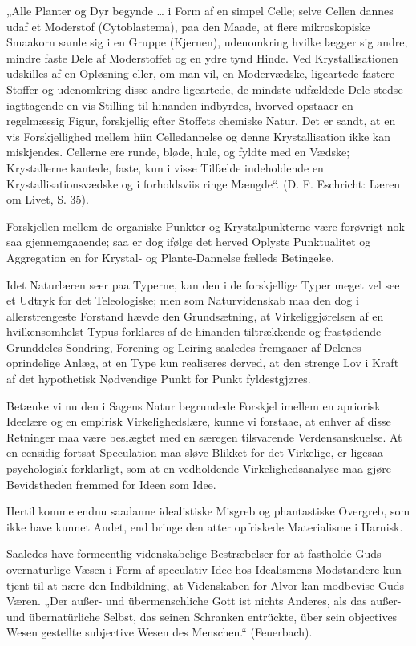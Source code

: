 \documentclass[12pt]{book}
\newcommand{\opage}[1]{\marginnote{\footnotesize\textit{[#1]}}}
\begin{document}
„Alle Planter og Dyr begynde \ldots{} i Form af en simpel Celle; selve Cellen dannes udaf et
Moderstof (Cytoblastema), paa den Maade, at flere mikroskopiske Smaakorn samle sig i en Gruppe
(Kjernen), udenomkring hvilke lægger sig andre, mindre faste Dele af Moderstoffet og en ydre tynd
Hinde. Ved Krystallisationen udskilles af en Opløsning eller, om man vil, en Modervædske, ligeartede
fastere Stoffer og udenomkring disse andre ligeartede, de mindste udfældede Dele stedse iagttagende
en vis Stilling til hinanden indbyrdes, hvorved opstaaer en regelmæssig Figur, forskjellig efter
Stoffets chemiske Natur. Det er sandt, at en vis Forskjellighed mellem hiin Celledannelse og denne
Krystallisation ikke kan miskjendes. Cellerne ere runde, bløde, hule, og fyldte med en Vædske;
Krystallerne kantede, faste, kun i visse Tilfælde indeholdende en Krystallisationsvædske og i
forholdsviis ringe Mængde“. (D. F. Eschricht: Læren om Livet, S. 35).

Forskjellen mellem de organiske Punkter og Krystalpunkterne være forøvrigt nok saa gjennemgaaende;
saa er dog ifølge det herved Oplyste Punktualitet og Aggregation en for Krystal- og Plante-Dannelse
fælleds Betingelse.

Idet Naturlæren seer paa Typerne, kan den i de forskjellige Typer meget vel see et Udtryk for det
Teleologiske; men som Naturvidenskab maa den dog i allerstrengeste Forstand hævde den Grundsætning,
at Virkeliggjørelsen af en hvilkensomhelst Typus forklares af de hinanden tiltrækkende
\opage{177} og frastødende Grunddeles Sondring, Forening og Leiring saaledes fremgaaer af Delenes oprindelige
Anlæg, at en Type kun realiseres derved, at den strenge Lov i Kraft af det hypothetisk Nødvendige
Punkt for Punkt fyldestgjøres.

Betænke vi nu den i Sagens Natur begrundede Forskjel imellem en apriorisk Ideelære og en empirisk
Virkelighedslære, kunne vi forstaae, at enhver af disse Retninger maa være beslægtet med en særegen
tilsvarende Verdensanskuelse. At en eensidig fortsat Speculation maa sløve Blikket for det Virkelige,
er ligesaa psychologisk forklarligt, som at en vedholdende Virkelighedsanalyse maa gjøre
Bevidstheden fremmed for Ideen som Idee.

Hertil komme endnu saadanne idealistiske Misgreb og phantastiske Overgreb, som ikke have kunnet
Andet, end bringe den atter opfriskede Materialisme i Harnisk.

Saaledes have formeentlig videnskabelige Bestræbelser for at fastholde Guds overnaturlige Væsen i
Form af speculativ Idee hos Idealismens Modstandere kun tjent til at nære den Indbildning, at
Videnskaben for Alvor kan modbevise Guds Væren. „Der außer- und übermenschliche Gott ist nichts
Anderes, als das außer- und übernatürliche Selbst, das seinen Schranken entrückte, über sein
objectives Wesen gestellte subjective Wesen des Menschen.“ (Feuerbach).
\end{document}
